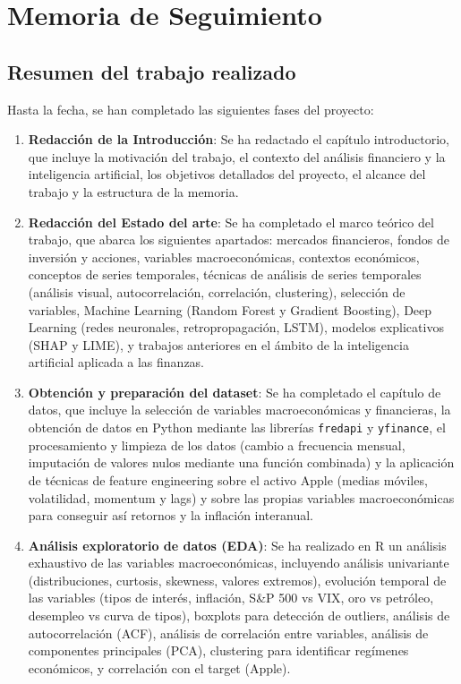 \chapter{Memoria de Seguimiento}
\label{ch:seguimiento}

\section{Resumen del trabajo realizado}

Hasta la fecha, se han completado las siguientes fases del proyecto:

\begin{enumerate}
    \item \textbf{Redacción de la Introducción}: Se ha redactado el capítulo introductorio, que incluye la motivación del trabajo, el contexto del análisis financiero y la inteligencia artificial, los objetivos detallados del proyecto, el alcance del trabajo y la estructura de la memoria.
    
    \item \textbf{Redacción del Estado del arte}: Se ha completado el marco teórico del trabajo, que abarca los siguientes apartados: mercados financieros, fondos de inversión y acciones, variables macroeconómicas, contextos económicos, conceptos de series temporales, técnicas de análisis de series temporales (análisis visual, autocorrelación, correlación, clustering), selección de variables, Machine Learning (Random Forest y Gradient Boosting), Deep Learning (redes neuronales, retropropagación, LSTM), modelos explicativos (SHAP y LIME), y trabajos anteriores en el ámbito de la inteligencia artificial aplicada a las finanzas.
    
    \item \textbf{Obtención y preparación del dataset}: Se ha completado el capítulo de datos, que incluye la selección de variables macroeconómicas y financieras, la obtención de datos en Python mediante las librerías \texttt{fredapi} y \texttt{yfinance}, el procesamiento y limpieza de los datos (cambio a frecuencia mensual, imputación de valores nulos mediante una función combinada) y la aplicación de técnicas de feature engineering sobre el activo Apple (medias móviles, volatilidad, momentum y lags) y sobre las propias variables macroeconómicas para conseguir así retornos y la inflación interanual.
    
    \item \textbf{Análisis exploratorio de datos (EDA)}: Se ha realizado en R un análisis exhaustivo de las variables macroeconómicas, incluyendo análisis univariante (distribuciones, curtosis, skewness, valores extremos), evolución temporal de las variables (tipos de interés, inflación, S\&P 500 vs VIX, oro vs petróleo, desempleo vs curva de tipos), boxplots para detección de outliers, análisis de autocorrelación (ACF), análisis de correlación entre variables, análisis de componentes principales (PCA), clustering para identificar regímenes económicos, y correlación con el target (Apple).
    

\end{enumerate}
